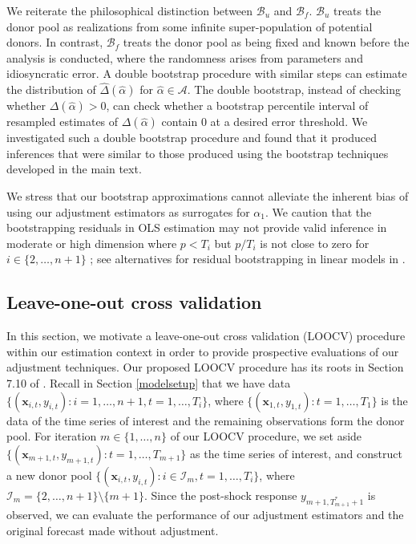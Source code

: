 \documentclass[11pt,3p,review,authoryear]{elsarticle}
\def\mbf#1{\mathbf{#1}} %
\def\mc#1{\mathcal{#1}} %
\theoremstyle{definition}
\begin{document}
We reiterate the philosophical distinction between $\mc{B}_u$ and $\mc{B}_f$. $\mc{B}_u$ treats the donor pool as realizations from some infinite super-population of potential donors. In contrast, $\mc{B}_f$ treats the donor pool as being fixed  and known before the analysis is conducted, where the randomness arises from parameters and idiosyncratic error. A double bootstrap procedure with similar steps can estimate the distribution of $\hat\Delta(\hat{\alpha})$ for $\hat{\alpha} \in \mc{A}$. The double bootstrap, instead of checking whether $\Delta(\hat{\alpha})>0$, can check whether a bootstrap percentile interval of resampled estimates of $\Delta(\hat{\alpha})$ contain 0 at a desired error threshold. We investigated such a double bootstrap procedure and found that it produced inferences that were similar to those produced using the bootstrap techniques developed in the main text.

We stress that our bootstrap approximations cannot alleviate the inherent bias of using our adjustment estimators as surrogates for $\alpha_1$. We caution that the bootstrapping residuals in OLS estimation may not provide valid inference in moderate or high dimension where $p < T_i$ but $p / T_i$ is not close to zero for $i\in \{2, \ldots, n+1\}$ \citep{el2018can}; see alternatives for residual bootstrapping in linear models in \citet{el2018can}. 


\subsection{Leave-one-out cross validation}
\label{loocv}

In this section, we motivate a leave-one-out cross validation (LOOCV) procedure within our estimation context in order to provide prospective evaluations of our adjustment techniques. Our proposed LOOCV procedure has its roots in Section 7.10 of \citet{hastie2009elements}.  Recall in Section \ref{modelsetup} that we have data $\{(\mbf{x}_{i,t}, y_{i,t}) \colon i = 1, \ldots, n+1, t = 1, \ldots, T_i\}$, where $\{(\mbf{x}_{1,t}, y_{1,t})\colon t = 1, \ldots, T_1\}$ is the data of the time series of interest and the remaining observations form the donor pool. For iteration $m \in \{1,\ldots,n\}$ of our LOOCV procedure, we set aside $\{(\mbf{x}_{m + 1, t}, y_{m + 1, t}) \colon t = 1, \ldots, T_{m+1}\}$ as the time series of interest, and construct a new donor pool $\{(\mbf{x}_{i, t}, y_{i, t}) \colon i \in \mc{I}_m, t = 1, \ldots, T_{i}\}$, where $\mc{I}_m=\{2, \ldots, n+1\} \setminus \{m+1\}$. Since the post-shock response $y_{m+1, T_{m+1}^*+1}$ is observed, we can evaluate the performance of our adjustment estimators and the original forecast made without adjustment.
\end{document}
